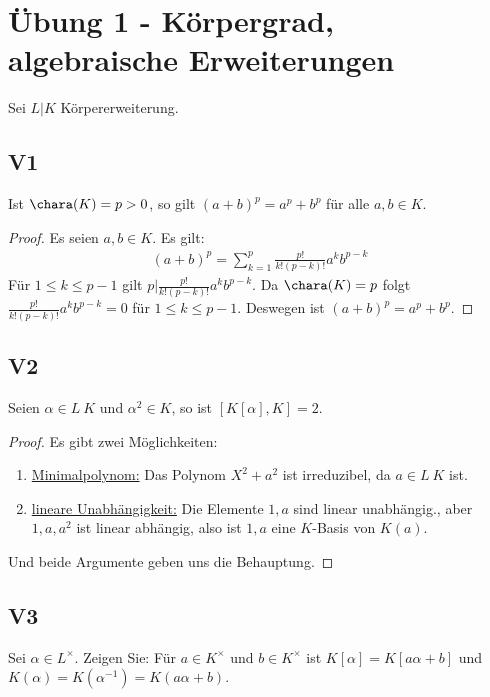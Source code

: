 
\section{Übung 1 - Körpergrad, algebraische Erweiterungen}
Sei $L \vert K$ Körpererweiterung.
\subsection{V1}
Ist $\chara(K) = p >0$, so gilt $(a+b)^p = a^p + b^p$ für alle $a,b \in K$.
\begin{proof}
	Es seien $a,b \in K$. Es gilt:
	\begin{align*}
		(a+b)^p = \sum_{k=1}^p \frac{p!}{k! (p-k)!}a^k b^{p-k}
	\end{align*}
	Für $1 \le k \le p-1$ gilt $p \vert \frac{p!}{k! (p-k)!}a^k b^{p-k}$. Da $\chara(K) = p$ folgt $\frac{p!}{k! (p-k)!}a^k b^{p-k} = 0$ für $1 \le k \le p-1$. Deswegen ist $(a+b)^p = a^p + b^p$.
\end{proof}

\subsection{V2}
Seien $\alpha \in L \ K$ und $\alpha^2 \in K$, so ist $[K[\alpha], K] = 2$. 
\begin{proof}
	Es gibt zwei Möglichkeiten:
	\begin{enumerate}
		\item \ul{Minimalpolynom:} Das Polynom $X^2+a^2$ ist irreduzibel, da $a \in L \ K$ ist.
		\item \ul{lineare Unabhängigkeit:} Die Elemente $1,a$ sind linear unabhängig., aber $1,a,a^2$ ist linear abhängig, also ist $1,a$ eine $K$-Basis von $K(a)$.
	\end{enumerate}
	Und beide Argumente geben uns die Behauptung.
\end{proof}

\subsection{V3}
Sei $\alpha \in L^{\times}$. Zeigen Sie: Für $a \in K^{\times}$ und $b \in K^{\times}$ ist $K[\alpha] = K[a\alpha + b]$ und $K(\alpha) = K(\alpha^{-1}) = K(a\alpha + b)$.

